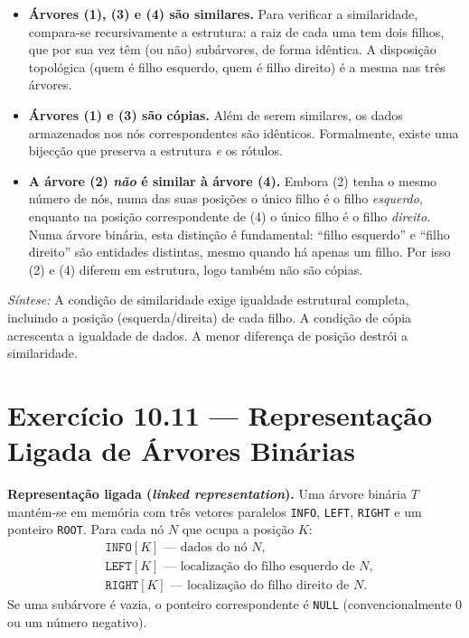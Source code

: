 \documentclass[12pt,a4paper]{article}
\begin{document}
\begin{itemize}
  \item \textbf{Árvores (1), (3) e (4) são similares.}
  Para verificar a similaridade, compara-se recursivamente a estrutura: a raiz de cada uma
  tem dois filhos, que por sua vez têm (ou não) subárvores, de forma idêntica. A disposição
  topológica (quem é filho esquerdo, quem é filho direito) é a mesma nas três árvores.

  \item \textbf{Árvores (1) e (3) são cópias.}
  Além de serem similares, os dados armazenados nos nós correspondentes são idênticos.
  Formalmente, existe uma bijecção que preserva a estrutura \emph{e} os rótulos.

  \item \textbf{A árvore (2) \emph{não} é similar à árvore (4).}
  Embora (2) tenha o mesmo número de nós, numa das suas posições o único filho é
  o filho \emph{esquerdo}, enquanto na posição correspondente de (4) o único filho é
  o filho \emph{direito}. Numa árvore binária, esta distinção é fundamental:
  ``filho esquerdo'' e ``filho direito'' são entidades distintas, mesmo quando há
  apenas um filho. Por isso (2) e (4) diferem em estrutura, logo também não são cópias.
\end{itemize}

\medskip
\noindent\textit{Síntese:} A condição de similaridade exige igualdade estrutural completa,
incluindo a posição (esquerda/direita) de cada filho. A condição de cópia acrescenta a
igualdade de dados. A menor diferença de posição destrói a similaridade.

\section*{Exercício 10.11 — Representação Ligada de Árvores Binárias}

\begin{teoriacaixa}
\textbf{Representação ligada (\textit{linked representation}).}
Uma árvore binária $T$ mantém-se em memória com três vetores paralelos \texttt{INFO},
\texttt{LEFT}, \texttt{RIGHT} e um ponteiro \texttt{ROOT}. Para cada nó $N$ que ocupa
a posição $K$:
\begin{align*}
  &\texttt{INFO}[K] \text{ --- dados do nó } N,\\
  &\texttt{LEFT}[K] \text{ --- localização do filho esquerdo de } N,\\
  &\texttt{RIGHT}[K] \text{ --- localização do filho direito de } N.
\end{align*}
Se uma subárvore é vazia, o ponteiro correspondente é \texttt{NULL} (convencionalmente
$0$ ou um número negativo).
\end{teoriacaixa}
\end{document}
